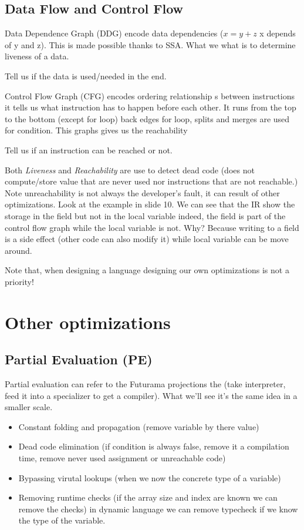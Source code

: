 \subsection{Data Flow and Control Flow}
Data Dependence Graph (DDG) encode data dependencies ($x = y + z$ x depends of y
and z). This is made possible thanks to SSA. What we what is to determine
liveness of a data.
\theoremstyle{definition}
\begin{definition}[Liveness]
    Tell us if the data is used/needed in the end.
\end{definition}
Control Flow Graph (CFG) encodes ordering relationship s between instructions it
tells us what instruction has to happen before each other. It runs from the top
to the bottom (except for loop) back edges for loop, splits and merges are used
for condition. This graphs gives us the reachability
\theoremstyle{definition}
\begin{definition}[Reachability]
    Tell us if an instruction can be reached or not.
\end{definition}
Both \textit{Liveness} and \textit{Reachability} are use to detect dead code
(does not compute/store value that are never used nor instructions that are not
reachable.) Note unreachability is not always the developer's fault, it can
result of other optimizations. Look at the example in slide 10. We can see that
the IR show the storage in the field but not in the local variable indeed, the
field is part of the control flow graph while the local variable is not. Why?
Because writing to a field is a side effect (other code can also modify it)
while local variable can be move around.

Note that, when designing a language designing our own optimizations is not a
priority!

\section{Other optimizations}
\subsection{Partial Evaluation (PE)}
Partial evaluation can refer to the Futurama projections the (take interpreter,
feed it into a specializer to get a compiler). What we'll see it's the same idea
in a smaller scale.
\begin{itemize}
    \item Constant folding and propagation (remove variable by there value)
    \item Dead code elimination (if condition is always false, remove it a compilation time, remove never used assignment or unreachable code)
    \item Bypassing virutal lookups (when we now the concrete type of a variable)
    \item Removing runtime checks (if the array size and index are known we can
    remove the checks) in dynamic language we can remove typecheck if we know
    the type of the variable.
\end{itemize}

